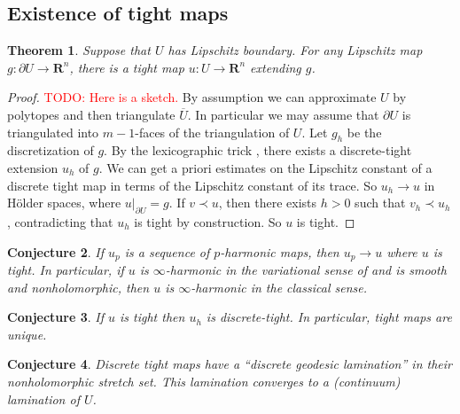 \documentclass[reqno,11pt]{amsart}
\newcommand{\RR}{\mathbf{R}}
\newtheorem{theorem}{Theorem}[section]
\newtheorem{conjecture}[theorem]{Conjecture}
\theoremstyle{definition}
\numberwithin{equation}{section}
\newcommand\todo[1]{\textcolor{red}{TODO: #1}}
\begin{document}
\subsection{Existence of tight maps}
\begin{theorem}
Suppose that $U$ has Lipschitz boundary.
For any Lipschitz map $g: \partial U \to \RR^n$, there is a tight map $u: U \to \RR^n$ extending $g$.
\end{theorem}
\begin{proof}
\todo{Here is a sketch.}
By assumption we can approximate $U$ by polytopes and then triangulate $\overline U$.
In particular we may assume that $\partial U$ is triangulated into $m - 1$-faces of the triangulation of $U$.
Let $g_h$ be the discretization of $g$.
By the lexicographic trick \cite[Theorem 1.2]{Sheffield12}, there exists a discrete-tight extension $u_h$ of $g$.
We can get a priori estimates on the Lipschitz constant of a discrete tight map in terms of the Lipschitz constant of its trace.
So $u_h \to u$ in H\"older spaces, where $u|_{\partial U} = g$.
If $v \prec u$, then there exists $h > 0$ such that $v_h \prec u_h$, contradicting that $u_h$ is tight by construction.
So $u$ is tight.
\end{proof}

\begin{conjecture}
If $u_p$ is a sequence of $p$-harmonic maps, then $u_p \to u$ where $u$ is tight.
In particular, if $u$ is $\infty$-harmonic in the variational sense of \cite{daskalopoulos2022} and is smooth and nonholomorphic, then $u$ is $\infty$-harmonic in the classical sense.
\end{conjecture}

\begin{conjecture}
If $u$ is tight then $u_h$ is discrete-tight.
In particular, tight maps are unique.
\end{conjecture}

\begin{conjecture}
Discrete tight maps have a ``discrete geodesic lamination'' in their nonholomorphic stretch set.
This lamination converges to a (continuum) lamination of $U$.
\end{conjecture}

\printbibliography
\end{document}
